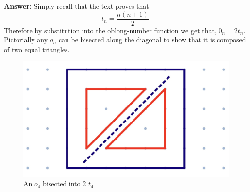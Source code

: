 \documentclass[12pt]{article}
\theoremstyle{homework}
\begin{document}
\begin{enumerate}
\textbf{Answer:} Simply recall that the text proves that,
  \begin{equation*}
    t_n = \frac{n(n+1)}{2}.
  \end{equation*}
Therefore by substitution into the oblong-number function we get that, $0_n = 2t_n$. Pictorially any $o_n$ can be bisected along the 
diagonal to show that it is composed of two equal triangles. 
  \begin{figure}[H]
    \begin{center}
    \caption{An $o_4$ bisected into 2 $t_4$}
  \includegraphics[width = .50\textwidth]{oblong.jpg}      
\end{center}
\end{figure}



\end{enumerate}
\vspace{.5in}
\end{document}
